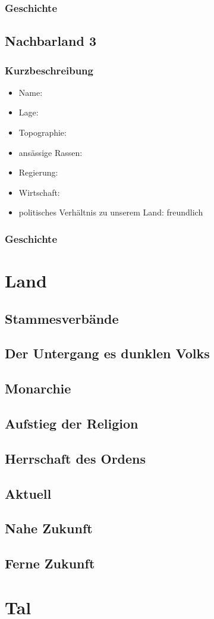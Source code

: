 \subsection{Geschichte}

\section{Nachbarland 3}
\subsection{Kurzbeschreibung}
\begin{itemize}
	\item Name: 
	\item Lage:
	\item Topographie:
	\item ansässige Rassen:
	\item Regierung:
	\item Wirtschaft:
	\item politisches Verhältnis zu unserem Land: freundlich
\end{itemize}

\subsection{Geschichte}

\chapter{Land}
\section{Stammesverbände}
\section{Der Untergang es dunklen Volks}
\section{Monarchie}
\section{Aufstieg der Religion}
\section{Herrschaft des Ordens}
\section{Aktuell}
\section{Nahe Zukunft}
\section{Ferne Zukunft}

\chapter{Tal}